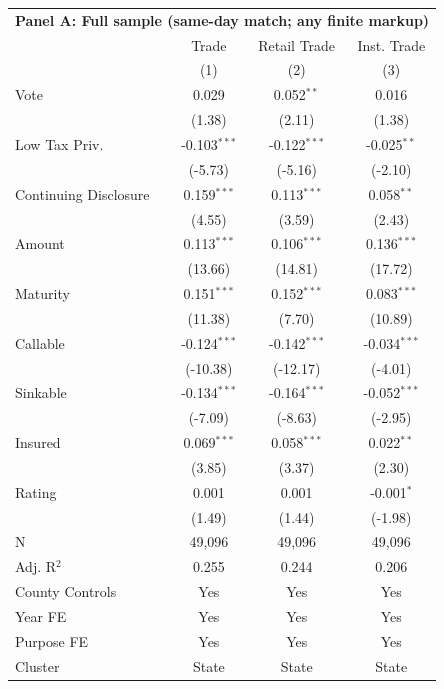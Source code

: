 \begingroup
\centering
\begin{tabular*}{\textwidth}{@{\extracolsep{\fill}}lccc}
\multicolumn{5}{l}{\textbf{Panel A: Full sample (same-day match; any finite markup)}}\\

\addlinespace
   \toprule
                         & Trade          & Retail Trade   & Inst. Trade\\  
                         & (1)            & (2)            & (3)\\  
   \midrule 
   Vote                  & 0.029          & 0.052$^{**}$   & 0.016\\   
                         & (1.38)        & (2.11)        & (1.38)\\   
   Low Tax Priv.         & -0.103$^{***}$ & -0.122$^{***}$ & -0.025$^{**}$\\   
                         & (-5.73)       & (-5.16)       & (-2.10)\\   
   Continuing Disclosure & 0.159$^{***}$  & 0.113$^{***}$  & 0.058$^{**}$\\   
                         & (4.55)        & (3.59)        & (2.43)\\   
   Amount                & 0.113$^{***}$  & 0.106$^{***}$  & 0.136$^{***}$\\   
                         & (13.66)       & (14.81)       & (17.72)\\   
   Maturity              & 0.151$^{***}$  & 0.152$^{***}$  & 0.083$^{***}$\\   
                         & (11.38)       & (7.70)        & (10.89)\\   
   Callable              & -0.124$^{***}$ & -0.142$^{***}$ & -0.034$^{***}$\\   
                         & (-10.38)      & (-12.17)      & (-4.01)\\   
   Sinkable              & -0.134$^{***}$ & -0.164$^{***}$ & -0.052$^{***}$\\   
                         & (-7.09)       & (-8.63)       & (-2.95)\\   
   Insured               & 0.069$^{***}$  & 0.058$^{***}$  & 0.022$^{**}$\\   
                         & (3.85)        & (3.37)        & (2.30)\\   
   Rating                & 0.001          & 0.001          & -0.001$^{*}$\\   
                         & (1.49)        & (1.44)        & (-1.98)\\   
   \hline
   N          & 49,096         & 49,096         & 49,096\\  
   Adj. R$^2$        & 0.255          & 0.244          & 0.206\\  
   County Controls       & Yes            & Yes            & Yes\\  
   Year FE               & Yes            & Yes            & Yes\\  
   Purpose FE            & Yes            & Yes            & Yes\\  
   Cluster              & State & State & State\\  
   \bottomrule
\end{tabular*}
\par\endgroup
